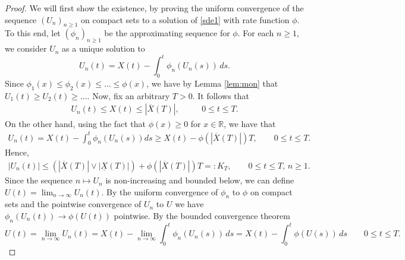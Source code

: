 \documentclass[12pt,reqno]{amsart}
\newcommand{\red}{\textcolor[rgb]{1.00,0.00,0.00}}
\newcommand{\blue}{\textcolor[rgb]{0.00,0.00,1.00}}
\theoremstyle{definition}
\theoremstyle{remark}
\begin{document}
\begin{proof}
We will first show the existence, by proving the uniform convergence of the sequence $(U_n)_{n\geq1}$ on compact sets to a solution of \eqref{sde1} with rate function $\phi$.
  To this end, let $(\phi_n)_{n\geq1}$ be the approximating sequence for  $\phi$. For each $n\geq1$, we consider $U_n$ 
as a unique solution to
  $$U_n(t)=X(t)-\int_0^t\phi_n(U_n(s))\,ds.$$
  Since $\phi_1(x)\le \phi_2(x)\le \ldots \le \phi(x)$, we have by Lemma \ref{lem:mon} that $U_1(t)\ge U_2(t)\ge \ldots $. 
	Now, fix an arbitrary $T>0$. It follows that
  \begin{align*}
    U_n(t)\leq X(t)\leq |\overline{X}(T)|,\qquad\text{ $0\le t\le T$}.
  \end{align*}
  On the other hand, using the fact that $\phi(x)\geq0$ for $x\in\mathbb{R}$, we have that
  \begin{align*}
  U_n(t)=X(t) -\int_0^t\phi_n(U_n(s))ds\geq X(t)-\phi(|\overline{X}(T)|)T,\qquad\text{$0\le t\le T$.}
  \end{align*}
  Hence, 
  \begin{align*}
  |U_n(t)|\le  (|\overline{X}(T)|\vee|\underline{X}(T)|)+\phi(|\overline{X}(T)|)T=:K_T,\qquad \text{$0\le t\le T$, $n\geq 1$}.
  \end{align*}
  Since the sequence  $n \mapsto U_n$ is non-increasing and bounded below, we can define $U(t)=\lim_{n\to\infty}U_n(t)$.
By the uniform convergence of $\phi_n$ to $\phi$ on compact sets
	and the pointwise  convergence of $U_n$ to $U$ we have $\phi_n(U_n(t))\to \phi(U(t))$ pointwise. By the bounded convergence theorem
$$U(t)=\lim_{n\to\infty} U_n(t)=X(t)-\lim_{n\to\infty}\int_0^t\phi_n(U_n(s))\,ds
  =X(t)-\int_0^t\phi(U(s))\,ds\qquad\text{$0\le t\le T$.}$$
  

\end{proof}
\end{document}
